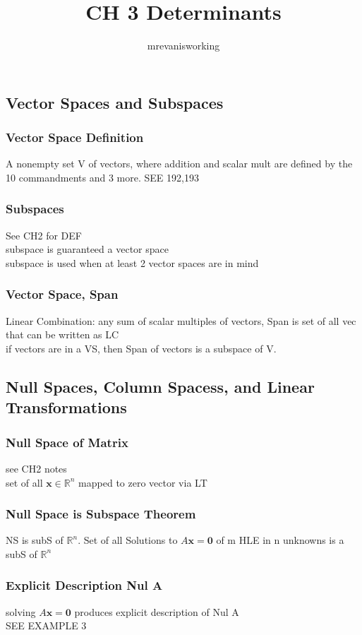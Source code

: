 \documentclass[12pt]{article}
\newcommand{\R}{\mathbb{R}}
\begin{document}
\title{CH 3 Determinants}
\author{mrevanisworking}
\maketitle

\subsection{Vector Spaces and Subspaces}
    \subsubsection{Vector Space Definition}
        A nonempty set V of vectors, where addition and scalar mult
        are defined by the 10 commandments and 3 more. SEE 192,193
    \subsubsection{Subspaces}
        See CH2 for DEF \\
        subspace is guaranteed a vector space \\
        subspace is used when at least 2 vector spaces are in mind
    \subsubsection{Vector Space, Span }
        Linear Combination: any sum of scalar multiples of vectors,
        Span is set of all vec that can be written as LC \\
        if vectors are in a VS, then Span of vectors is a subspace
        of V.
\subsection{Null Spaces, Column Spacess, and Linear Transformations}
    \subsubsection{Null Space of Matrix}
        see CH2 notes \\
        set of all $\bm{x}\in\R^n$  mapped to zero vector via LT
    \subsubsection{Null Space is Subspace Theorem}
        NS is subS of $\R^n$.
        Set of all Solutions to $A\bm{x}= \bm{0}$  of m HLE in n 
        unknowns is a subS of $\R^n$ 
    \subsubsection{Explicit Description Nul A}
        solving $A\bm{x}= \bm{0}$  produces explicit description of
        Nul A \\
        SEE EXAMPLE 3
\end{document}
